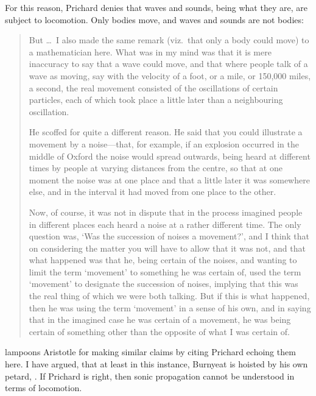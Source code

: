 \documentclass[12pt]{article}
\begin{document}
For this reason, Prichard denies that waves and sounds, being what they are, are subject to locomotion. Only bodies move, and waves and sounds are not bodies:
\begin{quotation}
	But \dots\ I also made the same remark (viz.\ that only a body could move) to a mathematician here. What was in my mind was that it is mere inaccuracy to say that a wave could move, and that where people talk of a wave as moving, say with the velocity of a foot, or a mile, or 150,000 miles, a second, the real movement consisted of the oscillations of certain particles, each of which took place a little later than a neighbouring oscillation.
	
	He scoffed for quite a different reason. He said that you could illustrate a movement by a noise---that, for example, if an explosion occurred in the middle of Oxford the noise would spread outwards, being heard at different times by people at varying distances from the centre, so that at one moment the noise was at one place and that a little later it was somewhere else, and in the interval it had moved from one place to the other.
	
	Now, of course, it was not in dispute that in the process imagined people in different places each heard a noise at a rather different time. The only question was, `Was the succession of noises a movement?', and I think that on considering the matter you will have to allow that it was not, and that what happened was that he, being certain of the noises, and wanting to limit the term `movement' to something he was certain of, used the term `movement' to designate the succession of noises, implying that this was the real thing of which we were both talking. But if this is what happened, then he was using the term `movement' in a sense of his own, and in saying that in the imagined case he was certain of a movement, he was being certain of something other than the opposite of what I was certain of. \citep[99]{Prichard:1950kx}
\end{quotation}
\citet[430 n. 29, appendix,]{Burnyeat:1995fk} lampoons Aristotle for making similar claims by citing Prichard echoing them here. I have argued, that at least in this instance, Burnyeat is hoisted by his own petard, \citep[chapter 3.2]{Kalderon:2015fr}. If Prichard is right, then sonic propagation cannot be understood in terms of locomotion.
\end{document}
